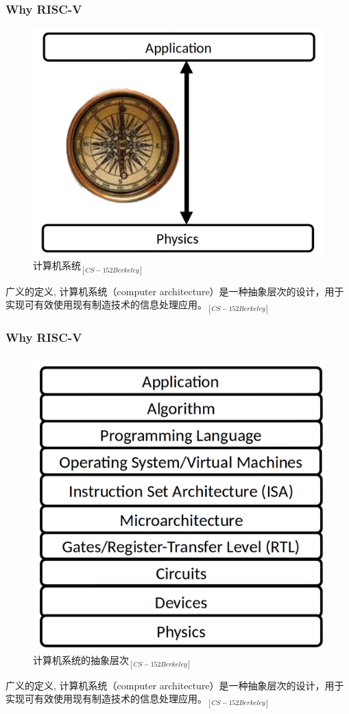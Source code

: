 \documentclass[UTF8]{ctexbeamer}
\begin{document}
\begin{frame}
	
	\frametitle{Why RISC-V}
	
	\begin{figure}
		\centering
		\includegraphics[width=0.45\linewidth]{computer-arch-app}
		\caption{计算机系统$_{[CS-152 Berkeley]}$}
	\end{figure}
	
	广义的定义, 计算机系统（computer architecture）是一种抽象层次的设计，用于实现可有效使用现有制造技术的信息处理应用。$_{[CS-152 Berkeley]}$
\end{frame}


\begin{frame}
	
	\frametitle{Why RISC-V}
	
	\begin{figure}
		\centering
		\includegraphics[width=0.45\linewidth]{abstract-of-system}
		\caption{计算机系统的抽象层次$ _{[CS-152 Berkeley]} $}
	\end{figure}
	
	广义的定义, 计算机系统（computer architecture）是一种抽象层次的设计，用于实现可有效使用现有制造技术的信息处理应用。$_{[CS-152 Berkeley]}$
	
\end{frame}
\end{document}
